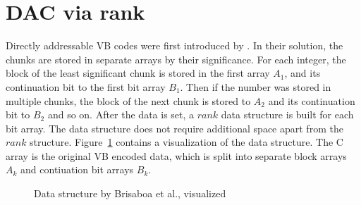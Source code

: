 \section{DAC via rank}
\label{chap:implementations}
Directly addressable VB codes were first introduced by \citep{Bri09}. In their solution, the chunks are stored in separate arrays by their significance. For each integer, the block 
of the least significant chunk is stored in the first array $A_1$, and its continuation bit to the first bit array $B_1$. Then if the number was stored in multiple chunks, the block of the next chunk is
stored to $A_2$ and its continuation bit to $B_2$ and so on. After the data is set, a $rank$ data structure is built for each bit array. The data structure does not require additional space apart
from the $rank$ structure. Figure~\ref{bris_ds} contains a visualization of the data structure. The C array is the original VB encoded data, which is split into separate block arrays $A_k$ and 
contiuation bit arrays $B_k$. 



\begin{figure}[ht]
\centering
{}
\caption{Data structure by Brisaboa et al., visualized}\label{bris_ds}

\end{figure}

